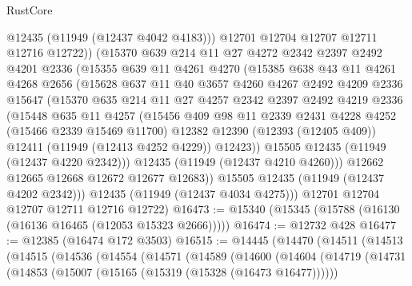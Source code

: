 \begin{lexlean}{RustCore}
\begin{coremodule}
              @12435
              (@11949 (@12437 @4042 @4183)))
            @12701
            @12704
            @12707
            @12711
            @12716
            @12722))
        (@15370
          @639
          @214
          @11
          @27
          @4272
          @2342
          @2397
          @2492
          @4201
          @2336
          (@15355
            @639
            @11
            @4261
            @4270
            (@15385
              @638
              @43
              @11
              @4261
              @4268
              @2656
              (@15628
                @637
                @11
                @40
                @3657
                @4260
                @4267
                @2492
                @4209
                @2336
                @15647
                (@15370
                  @635
                  @214
                  @11
                  @27
                  @4257
                  @2342
                  @2397
                  @2492
                  @4219
                  @2336
                  (@15448
                    @635
                    @11
                    @4257
                    (@15456
                      @409
                      @98
                      @11
                      @2339
                      @2431
                      @4228
                      @4252
                      (@15466 @2339 @15469 @11700)
                      @12382
                      @12390
                      (@12393 (@12405 @409))
                      @12411
                      (@11949 (@12413 @4252 @4229))
                      @12423))
                  @15505
                  @12435
                  (@11949 (@12437 @4220 @2342)))
                @12435
                (@11949 (@12437 @4210 @4260)))
              @12662
              @12665
              @12668
              @12672
              @12677
              @12683))
          @15505
          @12435
          (@11949 (@12437 @4202 @2342)))
        @12435
        (@11949 (@12437 @4034 @4275)))
      @12701
      @12704
      @12707
      @12711
      @12716
      @12722)
@16473 := @15340 (@15345 (@15788 (@16130 (@16136 @16465 (@12053 @15323 @2666)))))
@16474 := @12732 @428
@16477 := @12385 (@16474 @172 @3503)
@16515 := @14445
    (@14470
      (@14511
        (@14513
          (@14515
            (@14536
              (@14554
                (@14571
                  (@14589
                    (@14600
                      (@14604
                        (@14719
                          (@14731
                            (@14853 (@15007 (@15165 (@15319 (@15328 (@16473 @16477))))))

\end{coremodule}
\end{lexlean}
